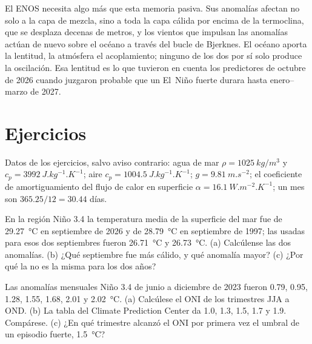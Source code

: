 El ENOS necesita algo más que esta memoria pasiva. Sus anomalías afectan no solo a la capa de mezcla, sino a
toda la capa cálida por encima de la termoclina, que se desplaza decenas de metros, y los vientos que
impulsan las anomalías actúan de nuevo sobre el océano a través del bucle de Bjerknes. El océano aporta la lentitud,
la atmósfera el acoplamiento; ninguno de los dos por sí solo produce la oscilación. Esa lentitud es lo que tuvieron en cuenta los
predictores de octubre de 2026 cuando juzgaron probable que un El~Niño fuerte durara hasta
enero--marzo de 2027.

\section*{Ejercicios}\label{sec:b2:climate-variability:exercises}

Datos de los ejercicios, salvo aviso contrario: agua de mar $\rho = \qty{1025}{kg/m^3}$ y $c_p =
\qty{3992}{J.kg^{-1}.K^{-1}}$; aire $c_p = \qty{1004.5}{J.kg^{-1}.K^{-1}}$; $g =
\qty{9.81}{m.s^{-2}}$; el coeficiente de amortiguamiento del flujo de calor en superficie $\alpha =
\qty{16.1}{W.m^{-2}.K^{-1}}$; un mes son $365.25/12 = 30.44$ días.

\begin{exercise}[$\star$]\label{exo:b2:climate-variability:1}
En la región Niño 3.4 la temperatura media de la superficie del mar fue de \qty{29.27}{\celsius} en septiembre
de 2026 y de \qty{28.79}{\celsius} en septiembre de 1997; las  usadas para esos dos septiembres
fueron \qty{26.71}{\celsius} y \qty{26.73}{\celsius}. (a) Calcúlense las dos anomalías. (b) ¿Qué
septiembre fue más cálido, y qué anomalía mayor? (c) ¿Por qué la  no es la misma para los
dos años?
\end{exercise}

\begin{exercise}[$\star$]\label{exo:b2:climate-variability:2}
Las anomalías mensuales Niño 3.4 de junio a diciembre de 2023 fueron 0.79, 0.95, 1.28, 1.55, 1.68, 2.01
y \qty{2.02}{\celsius}. (a) Calcúlese el ONI de los trimestres JJA a OND. (b) La tabla del
Climate Prediction Center da 1.0, 1.3, 1.5, 1.7 y 1.9. Compárese. (c) ¿En qué trimestre alcanzó el
ONI por primera vez el umbral de un episodio fuerte, \qty{1.5}{\celsius}?
\end{exercise}

